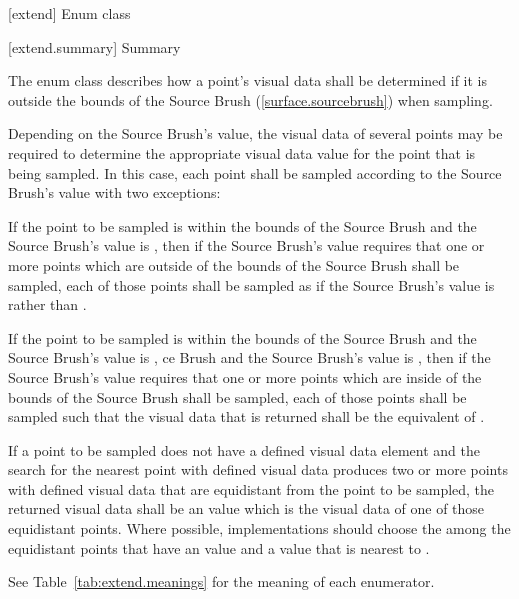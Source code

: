  [extend] {Enum class }

 [extend.summary] { Summary}

\pnum
The  enum class describes how a point's visual data shall be 
determined if it is outside the bounds of the Source Brush (\ref{surface.sourcebrush}) when sampling.

\pnum
Depending on the Source Brush's  value, the visual data of several points may be required to determine the appropriate visual data value for the point that is being sampled. In this case, each point shall be sampled according to the Source Brush's  value with two exceptions:
\begin{enumeratea}
\item If the point to be sampled is within the bounds of the Source Brush and the Source Brush's  value is , then if the Source Brush's  value requires that one or more points which are outside of the bounds of the Source Brush shall be sampled, each of those points shall be sampled as if the Source Brush's  value is  rather than .
\item If the point to be sampled is within the bounds of the Source Brush and the Source Brush's  value is , ce Brush and the Source Brush's  value is , then if the Source Brush's  value requires that one or more points which are inside of the bounds of the Source Brush shall be sampled, each of those points shall be sampled such that the visual data that is returned shall be the equivalent of .
\end{enumeratea}

\pnum
If a point to be sampled does not have a defined visual data element and the search for the nearest point with defined visual data produces two or more points with defined visual data that are equidistant from the point to be sampled, the returned visual data shall be an \unspecnorm value which is the visual data of one of those equidistant points. Where possible, implementations should choose the among the equidistant points that have an \xaxis value and a \yaxis value that is nearest to .

\pnum
See Table~\ref{tab:extend.meanings} for the meaning of each  enumerator.

